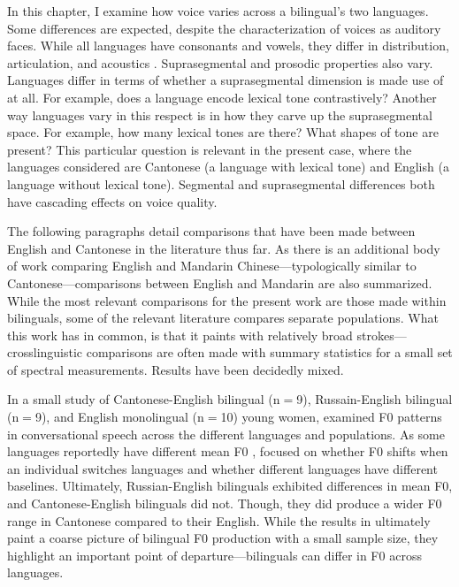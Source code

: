 In this chapter, I examine how voice varies across a bilingual's two languages. Some differences are expected, despite the characterization of voices as auditory faces. While all languages have consonants and vowels, they differ in distribution, articulation, and acoustics . Suprasegmental and prosodic properties also vary. Languages differ in terms of whether a suprasegmental dimension is made use of at all. For example, does a language encode lexical tone contrastively? Another way languages vary in this respect is in how they carve up the suprasegmental space. For example, how many lexical tones are there? What shapes of tone are present? This particular question is relevant in the present case, where the languages considered are Cantonese (a language with lexical tone) and English (a language without lexical tone). Segmental and suprasegmental differences both have cascading effects on voice quality. 

The following paragraphs detail comparisons that have been made between English and Cantonese in the literature thus far. As there is an additional body of work comparing English and Mandarin Chinese---typologically similar to Cantonese---comparisons between English and Mandarin are also summarized. While the most relevant comparisons for the present work are those made within bilinguals, some of the relevant literature compares separate populations. What this work has in common, is that it paints with relatively broad strokes---crosslinguistic comparisons are often made with summary statistics for a small set of spectral measurements. Results have been decidedly mixed. 

In a small study of Cantonese-English bilingual (n$=$9), Russain-English bilingual (n$=$9), and English monolingual (n$=$10) young women, \citet{altenberg_2006_f0} examined F0 patterns in conversational speech across the different languages and populations. As some languages reportedly have different mean F0 \citep[e.g.,][]{keating_2012_f0}, \citet{altenberg_2006_f0} focused on whether F0 shifts when an individual switches languages and whether different languages have different baselines. Ultimately, Russian-English bilinguals exhibited differences in mean F0, and Cantonese-English bilinguals did not. Though, they did produce a wider F0 range in Cantonese compared to their English. While the results in \citet{altenberg_2006_f0} ultimately paint a coarse picture of bilingual F0 production with a small sample size, they highlight an important point of departure---bilinguals can differ in F0 across languages. 


